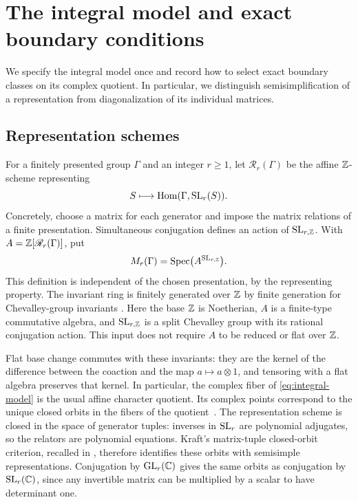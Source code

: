 \section{The integral model and exact boundary conditions}\label{sec:model}

We specify the integral model once and record how to select exact
boundary classes on its complex quotient. In particular, we distinguish
semisimplification of a representation from diagonalization of its
individual matrices.

\subsection{Representation schemes}

For a finitely presented group $\Gamma$ and an integer $r\geq1$, let
$\mathscr R_r(\Gamma)$ be the affine $\mathbb Z$-scheme representing
\[
 S\longmapsto\operatorname{Hom}(\Gamma,\operatorname{SL}_r(S)).
\]
Concretely, choose a matrix for each generator and impose the matrix
relations of a finite presentation. Simultaneous conjugation defines
an action of $\operatorname{SL}_{r,\mathbb Z}$. With
$A=\mathbb Z[\mathscr R_r(\Gamma)]$, put
\begin{equation}\label{eq:integral-model}
 M_r(\Gamma)=\operatorname{Spec}\bigl(A^{\operatorname{SL}_{r,\mathbb Z}}\bigr).
\end{equation}
This definition is independent of the chosen presentation, by the
representing property. The invariant ring is finitely generated over
$\mathbb Z$ by finite generation for Chevalley-group invariants
\cite[Theorem~3]{FranjouVanderKallen}.
Here the base $\mathbb Z$ is Noetherian, $A$ is a finite-type commutative
algebra, and $\operatorname{SL}_{r,\mathbb Z}$ is a split Chevalley group with its
rational conjugation action.  This input does not require $A$ to
be reduced or flat over $\mathbb Z$.

Flat base change commutes with these invariants: they are the kernel of
the difference between the coaction and the map $a\mapsto a\otimes1$,
and tensoring with a flat algebra preserves that kernel. In particular,
the complex fiber of \eqref{eq:integral-model} is the usual affine
character quotient. Its complex points correspond to the unique closed orbits
in the fibers of the quotient~\cite[pp.~184--185]{MumfordSuominen}.
The representation scheme is closed in the space of generator
tuples: inverses in $\operatorname{SL}_r$ are polynomial adjugates, so the
relators are polynomial equations. Kraft's matrix-tuple closed-orbit
criterion, recalled in \cite[Section~3.4]{BateMartinRoehrleTange},
therefore identifies these orbits with semisimple representations.
Conjugation by $\operatorname{GL}_r(\mathbb C)$ gives the same orbits as conjugation by
$\operatorname{SL}_r(\mathbb C)$, since any invertible matrix can be multiplied by a scalar
to have determinant one.

